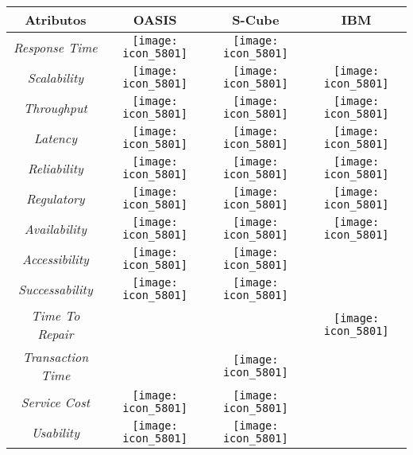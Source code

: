    \begin{table}[h]
    \begin{tabular}{ |c | c | c  | c|} 
    \hline
     \textbf{Atributos} & \textbf{OASIS} & \textbf{S-Cube}  & \textbf{IBM}  \\
      \hline
     	\emph{Response Time} & 
		\texttt{[image: icon\_5801]} & 
		\texttt{[image: icon\_5801]} & \\
	 \hline
     	\emph{Scalability} & 
		\texttt{[image: icon\_5801]} & 
		\texttt{[image: icon\_5801]} & 
		\texttt{[image: icon\_5801]} \\
	\hline
     	\emph{Throughput} & 
		\texttt{[image: icon\_5801]} & 
		\texttt{[image: icon\_5801]} & 
		\texttt{[image: icon\_5801]} \\
	\hline
     	\emph{Latency} & 
		\texttt{[image: icon\_5801]} & 
		\texttt{[image: icon\_5801]} & 
		\texttt{[image: icon\_5801]} \\
	\hline
     	\emph{Reliability} & 
		\texttt{[image: icon\_5801]} & 
		\texttt{[image: icon\_5801]} & 
		\texttt{[image: icon\_5801]} \\
	\hline
     	\emph{Regulatory} & 
		\texttt{[image: icon\_5801]} & 
		\texttt{[image: icon\_5801]} & 
		\texttt{[image: icon\_5801]} \\
	\hline
     	\emph{Availability} & 
		\texttt{[image: icon\_5801]} & 
		\texttt{[image: icon\_5801]} & 
		\texttt{[image: icon\_5801]} \\
	\hline
     	\emph{Accessibility} & 
		\texttt{[image: icon\_5801]} & 
		\texttt{[image: icon\_5801]} & \\
	\hline
     	\emph{Successability} & 
		\texttt{[image: icon\_5801]} & 
		\texttt{[image: icon\_5801]} & \\
	\hline
     	\emph{Time To Repair} & &  & 
		\texttt{[image: icon\_5801]} \\
	\hline
     	\emph{Transaction Time} & &
     	\texttt{[image: icon\_5801]}  &  \\
	\hline
	\hline
     	\emph{Service Cost} & 
		\texttt{[image: icon\_5801]} & 
		\texttt{[image: icon\_5801]} & \\
	\hline
     	\emph{Usability} & 
		\texttt{[image: icon\_5801]} & 
		\texttt{[image: icon\_5801]} & \\	

\end{tabular}
\end{table}

